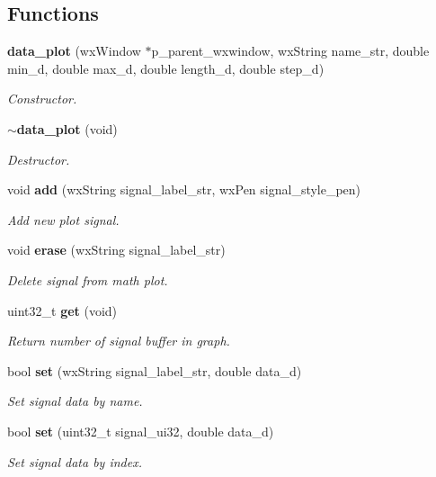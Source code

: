 \subsection*{Functions}
\begin{DoxyCompactItemize}
\item 
\textbf{ data\+\_\+plot} (wx\+Window $\ast$p\+\_\+parent\+\_\+wxwindow, wx\+String name\+\_\+str, double min\+\_\+d, double max\+\_\+d, double length\+\_\+d, double step\+\_\+d)
\begin{DoxyCompactList}\small\item\em Constructor. \end{DoxyCompactList}\item 
\textbf{ $\sim$data\+\_\+plot} (void)
\begin{DoxyCompactList}\small\item\em Destructor. \end{DoxyCompactList}\item 
void \textbf{ add} (wx\+String signal\+\_\+label\+\_\+str, wx\+Pen signal\+\_\+style\+\_\+pen)
\begin{DoxyCompactList}\small\item\em Add new plot signal. \end{DoxyCompactList}\item 
void \textbf{ erase} (wx\+String signal\+\_\+label\+\_\+str)
\begin{DoxyCompactList}\small\item\em Delete signal from math plot. \end{DoxyCompactList}\item 
uint32\+\_\+t \textbf{ get} (void)
\begin{DoxyCompactList}\small\item\em Return number of signal buffer in graph. \end{DoxyCompactList}\item 
bool \textbf{ set} (wx\+String signal\+\_\+label\+\_\+str, double data\+\_\+d)
\begin{DoxyCompactList}\small\item\em Set signal data by name. \end{DoxyCompactList}\item 
bool \textbf{ set} (uint32\+\_\+t signal\+\_\+ui32, double data\+\_\+d)
\begin{DoxyCompactList}\small\item\em Set signal data by index. \end{DoxyCompactList}\item 

\end{DoxyCompactItemize}
